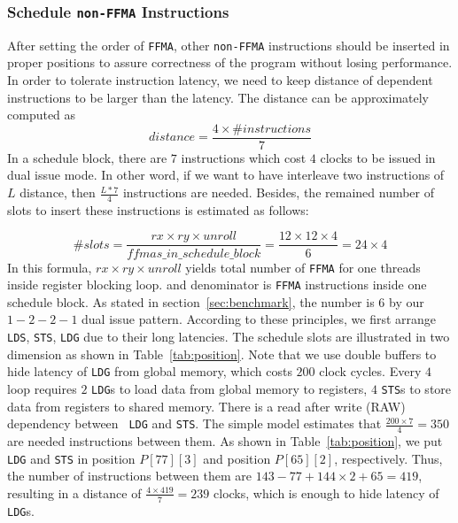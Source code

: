 \subsubsection{Schedule {\tt non-FFMA} Instructions}

After setting the order of {\tt FFMA}, other {\tt non-FFMA} instructions should be inserted in proper positions to assure
correctness of the program without losing performance. In order to tolerate instruction latency, we need to keep distance of dependent instructions to be larger than the latency. The distance can be approximately computed as
\begin{displaymath}
distance = \frac{4\times\#instructions}{7}
\end{displaymath}
In a schedule block, there are $7$ instructions which cost $4$ clocks to be issued in dual issue mode. In other word, if we want to have interleave
two instructions of $L$ distance, then $\frac{L*7}{4}$ instructions are needed. Besides, the remained number of slots to insert these instructions is estimated as follows:

\begin{displaymath}
\#slots = \frac{rx\times ry\times unroll}{ffmas\_in\_schedule\_block}=\frac{12\times 12\times 4}{6}=24\times 4
\end{displaymath}
In this formula, $rx\times ry\times unroll$ yields total number of {\tt FFMA} for one threads inside register blocking loop.
and denominator is {\tt FFMA} instructions inside one schedule block. As stated in section~\ref{sec:benchmark}, the number is $6$ by our $1-2-2-1$ dual issue pattern.
According to these principles, we first arrange {\tt LDS}, {\tt STS}, {\tt LDG} due to their long latencies. The
schedule slots are illustrated in two dimension as shown in Table~\ref{tab:position}.
Note that we use double buffers to hide latency of {\tt LDG} from global memory, which costs $200$ clock cycles.
Every $4$ loop requires $2$ {\tt LDG}s to load data from global memory to registers, $4$ {\tt STS}s to store data from registers to shared memory. There is a read after write (RAW) dependency between {\tt
LDG} and {\tt STS}. The simple model estimates that $\frac{200\times 7}{4} = 350$ are needed instructions between them.
As shown in Table~\ref{tab:position}, we put {\tt LDG} and  {\tt STS} in position $P[77][3]$ and position $P[65][2]$, respectively. Thus, the number of instructions between them are $143-77 + 144\times 2 +
65=419$, resulting in a distance of $\frac{4\times 419}{7}=239$ clocks, which is enough to hide latency of {\tt LDG}s.

